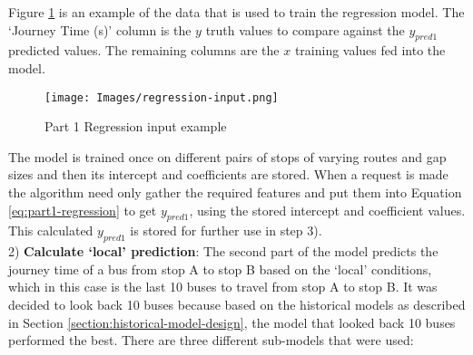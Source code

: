 Figure \ref{fig:part1-regression-input} is an example of the data that is used to train the regression model. The `Journey Time (s)' column is the $y$ truth values to compare against the $y_{pred1}$ predicted values. The remaining columns are the $x$ training values fed into the model.

\begin{figure}[H]
\begin{center}
    \texttt{[image: Images/regression-input.png]}
    \caption{Part 1 Regression input example}
    \label{fig:part1-regression-input}
\end{center}
\end{figure}

The model is trained once on different pairs of stops of varying routes and gap sizes and then its intercept and coefficients are stored. When a request is made the algorithm need only gather the required features and put them into Equation \ref{eq:part1-regression} to get $y_{pred1}$, using the stored intercept and coefficient values. This calculated $y_{pred1}$ is stored for further use in step 3). \\

2) \textbf{Calculate `local' prediction}: The second part of the model predicts the journey time of a bus from stop A to stop B based on the `local' conditions, which in this case is the last 10 buses to travel from stop A to stop B. It was decided to look back 10 buses because based on the historical models as described in Section \ref{section:historical-model-design}, the model that looked back 10 buses performed the best. There are three different sub-models that were used: \\

